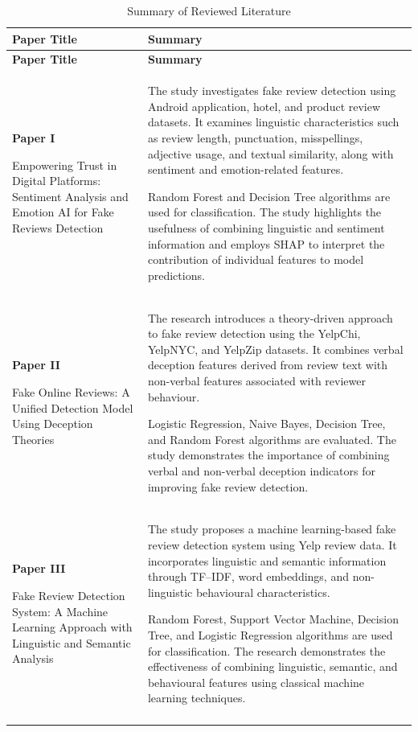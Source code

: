 \documentclass[12pt,a4paper]{report}
\begin{document}
\begin{longtable}{|
p{}|
p{}|}
\hline

\textbf{Paper Title} &
\textbf{Summary} \\
\hline
\endfirsthead

\hline
\textbf{Paper Title} &
\textbf{Summary} \\
\hline
\endhead

\textbf{Paper I}

Empowering Trust in Digital Platforms:
Sentiment Analysis and Emotion AI for
Fake Reviews Detection
&
The study investigates fake review detection using
Android application, hotel, and product review datasets.
It examines linguistic characteristics such as review
length, punctuation, misspellings, adjective usage,
and textual similarity, along with sentiment and
emotion-related features.

Random Forest and Decision Tree algorithms are used
for classification. The study highlights the usefulness
of combining linguistic and sentiment information
and employs SHAP to interpret the contribution of
individual features to model predictions.
\\
\hline

\textbf{Paper II}

Fake Online Reviews: A Unified Detection
Model Using Deception Theories
&
The research introduces a theory-driven approach
to fake review detection using the YelpChi,
YelpNYC, and YelpZip datasets. It combines
verbal deception features derived from review
text with non-verbal features associated with
reviewer behaviour.

Logistic Regression, Naive Bayes, Decision Tree,
and Random Forest algorithms are evaluated.
The study demonstrates the importance of
combining verbal and non-verbal deception
indicators for improving fake review detection.
\\
\hline

\textbf{Paper III}

Fake Review Detection System:
A Machine Learning Approach with
Linguistic and Semantic Analysis
&
The study proposes a machine learning-based
fake review detection system using Yelp
review data. It incorporates linguistic and
semantic information through TF--IDF,
word embeddings, and non-linguistic
behavioural characteristics.

Random Forest, Support Vector Machine,
Decision Tree, and Logistic Regression
algorithms are used for classification.
The research demonstrates the effectiveness
of combining linguistic, semantic, and
behavioural features using classical
machine learning techniques.
\\
\hline

\caption{Summary of Reviewed Literature}
\label{tab:litsummary}\\
\end{longtable}
\end{document}

